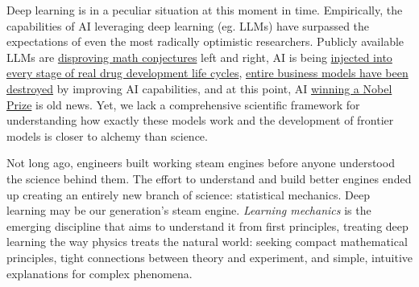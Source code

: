 Deep learning is in a peculiar situation at this moment in time. Empirically, the capabilities of AI leveraging deep learning (eg. LLMs) have surpassed the expectations of even the most radically optimistic researchers. Publicly available LLMs are \href{https://x.com/__alpoge__/status/2079028340955197566}{disproving math conjectures} left and right, AI is being \href{https://icml.cc/virtual/2026/invited-talk/67266}{injected into every stage of real drug development life cycles}, \href{https://tinyurl.com/2hhcsnz7}{entire business models have been destroyed} by improving AI capabilities, and at this point, AI \href{https://www.nobelprize.org/prizes/chemistry/2024/press-release/}{winning a Nobel Prize} is old news. Yet, we lack a comprehensive scientific framework for understanding 
how exactly these models work and the development of frontier models is closer to alchemy than science.

Not long ago, engineers built working steam engines before anyone understood the science behind them. The effort to understand and build better engines ended up creating an entirely new branch of science: statistical mechanics. Deep learning may be our generation's steam engine. \textit{Learning mechanics} is the emerging discipline that aims to understand it from first principles, treating deep learning the way physics treats the natural world: seeking compact mathematical principles, tight connections between theory and experiment, and simple, intuitive explanations for complex phenomena.



